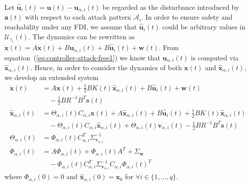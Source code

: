 \documentclass[journal]{IEEEtran}
\begin{document}
Let $\hat{\mathbf{u}}_i(t) = \mathbf{u}(t) - \mathbf{u}_{\alpha,i}(t)$ be regarded as the disturbance introduced by $\mathbf{a}(t)$ with respect to each attack pattern $\mathcal{A}_i.$ In order to ensure safety and reachability under any FDI, we assume that $\hat{\mathbf{u}}_i(t)$ could be arbitrary values in $\mathcal{U}_{\gamma_i}(t)$. The dynamics can be rewritten as $\dot{\mathbf{x}}(t) = A\mathbf{x}(t) + B\mathbf{u}_{\alpha,i}(t) + B\hat{\mathbf{u}}_i(t) + \mathbf{w}(t)$. From equation~(\ref{eq:controller-attack-free1}) we know that $\mathbf{u}_{\alpha,i}(t)$ is computed via $\hat{\mathbf{x}}_{\alpha,i}(t).$ Hence, in order to consider the dynamics of both $\mathbf{x}(t)$ and $\hat{\mathbf{x}}_{\alpha,i}(t),$ we develop an extended system
\begin{equation*}
    \begin{array}{ll}
        \dot{\mathbf{x}}(t)&= A\mathbf{x}(t) + \frac{1}{2}BK(t)\hat{\mathbf{x}}_{\alpha,i}(t) + B\hat{\mathbf{u}}_i(t) + \mathbf{w}(t) \\
        &\quad- \frac{1}{2}BR^{-1}B^{T}\mathbf{s}(t) \\
        \dot{\hat{\mathbf{x}}}_{\alpha,i}(t)&= \Theta_{\alpha,i}(t)C_{\alpha,i}\mathbf{x}(t) + A\hat{\mathbf{x}}_{\alpha,i}(t) + B\hat{\mathbf{u}}_i(t) + \frac{1}{2}BK(t)\hat{\mathbf{x}}_{\alpha,i}(t)\\
        &\quad-\Theta_{\alpha,i}(t)C_{\alpha,i}\hat{\mathbf{x}}_{\alpha,i}(t)  + \Theta_{\alpha,i}(t)\mathbf{v}_{\alpha,i}(t)- \frac{1}{2}BR^{-1}B^{T}\mathbf{s}(t)\\
        \Theta_{\alpha,i}(t)&= \Phi_{\alpha,i}(t)C_{\alpha,i}^{T}\Sigma_{\mathbf{v}_{\alpha,i}}^{-1} \\
        \dot{\Phi}_{\alpha,i}(t)&= A\Phi_{\alpha,i}(t) + \Phi_{\alpha,i}(t)A^{T} + \Sigma_{\mathbf{w}} \\
        &\quad- \Phi_{\alpha,i}(t)C_{\alpha,i}^{T}\Sigma_{\mathbf{v}_{\alpha,i}}^{-1}C_{\alpha,i}\Phi_{\alpha,i}(t)^{T}
    \end{array}
\end{equation*}
where $\Phi_{\alpha,i}(0) = 0$ and $\hat{\mathbf{x}}_{\alpha,i}(0)=\mathbf{x}_0$ for $\forall i \in \{1,\ldots,q\}$.
\end{document}
